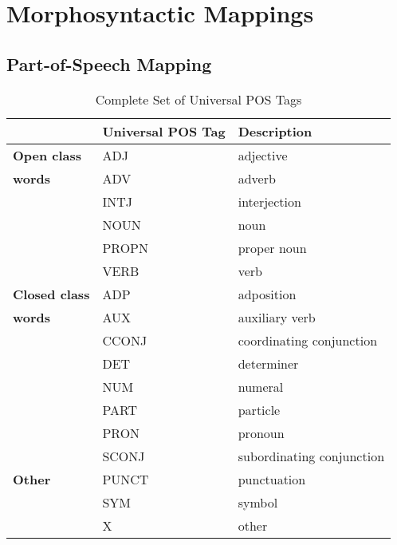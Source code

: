  
\chapter{Morphosyntactic Mappings}
\label{appendixa}

\section{Part-of-Speech Mapping}

\begin{table}[h!]
\caption {Complete Set of Universal POS Tags } \label{tab:uposset}
\begin{tabularx}{\linewidth}{@{}llX@{}}
\toprule
 & \textbf{Universal POS Tag} & \textbf{Description}\\ \midrule
\textbf{Open class} & ADJ & adjective\\
\textbf{words} & ADV & adverb\\
 & INTJ & interjection\\
 & NOUN & noun\\
 & PROPN & proper noun\\
 & VERB & verb\\\addlinespace
\textbf{Closed class} & ADP & adposition\\
\textbf{words} & AUX & auxiliary verb\\
 & CCONJ & coordinating conjunction\\
 & DET & determiner\\
 & NUM & numeral\\
 & PART & particle\\
 & PRON & pronoun\\
 & SCONJ & subordinating conjunction\\\addlinespace
\textbf{Other} & PUNCT & punctuation\\
 & SYM & symbol\\
 & X & other\\\bottomrule
\end{tabularx}
\end{table}

